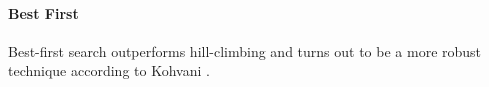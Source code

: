 \paragraph{Best First}
\label{par:methods.flat.wrapper.best_first}

  
Best-first search outperforms hill-climbing and turns out to be a more robust technique according to Kohvani \cite{Kohavi:97}.